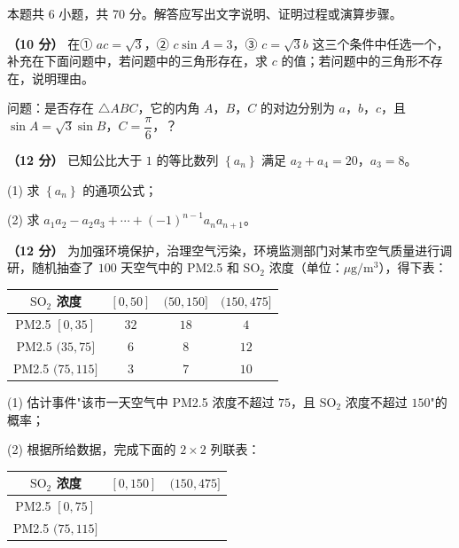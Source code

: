 \begin{center}\end{center}

\par\medskip


\begin{gktip}
本题共 6 小题，共 70 分。解答应写出文字说明、证明过程或演算步骤。
\end{gktip}

\textbf{（10 分）} 在① $ac=\sqrt3$，② $c\sin A=3$，③ $c=\sqrt3b$ 这三个条件中任选一个，补充在下面问题中，若问题中的三角形存在，求 $c$ 的值；若问题中的三角形不存在，说明理由。

问题：是否存在 $\triangle ABC$，它的内角 $A$，$B$，$C$ 的对边分别为 $a$，$b$，$c$，且 $\sin A=\sqrt3\sin B$，$C=\dfrac\pi6$，\gkblank{}？

\textbf{（12 分）} 已知公比大于 $1$ 的等比数列 $\left\{a_n\right\}$ 满足 $a_2+a_4=20$，$a_3=8$。

  (1) 求 $\left\{a_n\right\}$ 的通项公式；

  (2) 求 $a_1a_2-a_2a_3+\cdots+(-1)^{n-1}a_na_{n+1}$。

\textbf{（12 分）} 为加强环境保护，治理空气污染，环境监测部门对某市空气质量进行调研，随机抽查了 $100$ 天空气中的 PM2.5 和 $\mathrm{SO_2}$ 浓度（单位：$\mu\mathrm g/\mathrm m^{3}$），得下表：

\begin{center}
\begin{tabular}{cccc}
\toprule
$\mathrm{SO_2}$ 浓度 & $[0,50]$ & $(50,150]$ & $(150,475]$ \\
\midrule
PM2.5 $[0,35]$ & $32$ & $18$ & $4$ \\
PM2.5 $(35,75]$ & $6$ & $8$ & $12$ \\
PM2.5 $(75,115]$ & $3$ & $7$ & $10$ \\
\bottomrule
\end{tabular}
\end{center}

  (1) 估计事件"该市一天空气中 PM2.5 浓度不超过 $75$，且 $\mathrm{SO_2}$ 浓度不超过 $150$"的概率；

  (2) 根据所给数据，完成下面的 $2\times2$ 列联表：

\begin{center}
\begin{tabular}{ccc}
\toprule
$\mathrm{SO_2}$ 浓度 & $[0,150]$ & $(150,475]$ \\
\midrule
PM2.5 $[0,75]$ &  &  \\
PM2.5 $(75,115]$ &  &  \\
\bottomrule
\end{tabular}
\end{center}

